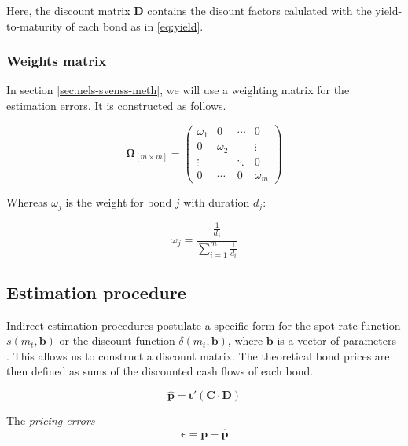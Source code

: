 Here, the discount matrix $\bm{D}$ contains the disount factors calulated with the yield-to-maturity of each bond as in \eqref{eq:yield}.

\subsubsection*{Weights matrix}

In section \ref{sec:nels-svenss-meth}, we will use a weighting matrix for the estimation errors. It is constructed  as follows.

\begin{equation*}\label{weights}
    \bm{\Omega}_{\left[m\times m\right]}= \begin{pmatrix}
 \omega_1 & 0 &\cdots  &0  \\
 0 & \omega_2 &  & \vdots \\
 \vdots &  & \ddots & 0 \\
 0 &\cdots  &0  & \omega_m
\end{pmatrix}
\end{equation*}


Whereas $\omega_j$ is the weight for bond $j$ with duration $d_j$:

\begin{equation}
\label{eq:durationweight}
    \omega_j=\frac{\frac{1}{d_j}}{\sum_{i=1}^m\frac{1}{d_i}}
\end{equation}



\subsection{Estimation procedure}
\label{sec:estimation}

Indirect estimation procedures postulate a specific form for the spot rate function $s(m_t, \bm{b})$ or the discount function $\delta(m_t, \bm{b})$, where $\bm{b}$ is a vector of parameters \citep[see, e.g.][]{Martellini2003}. This allows us to construct a discount matrix. The theoretical bond prices are then defined as sums of the discounted cash flows of each bond.

\begin{equation}
  \label{eq:theorprices}
  \bm{\hat{p}} = \bm{\iota}'(\bm{C}\cdot\bm{D})
\end{equation}



The \emph{pricing errors}
\begin{equation}
  \label{eq:pricingerrors}
  \bm{\epsilon} = \bm{p-\hat{p}}
\end{equation}

